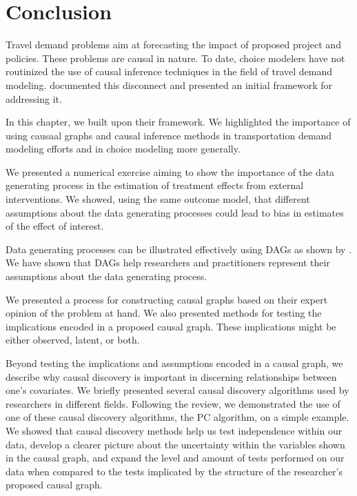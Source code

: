 \section{Conclusion}
\label{sec:conclusion}

Travel demand problems aim at forecasting the impact of proposed project and policies. These problems are causal in nature. 
To date, choice modelers have not routinized the use of causal inference techniques in the field of travel demand modeling.
\citet{brathwaite_2018_causal} documented this disconnect and presented an initial framework for addressing it.

In this chapter, we built upon their framework.
We highlighted the importance of using causaal graphs and causal inference methods in transportation demand modeling efforts and in choice modeling more generally.

We presented a numerical exercise aiming to show the importance of the data generating process in the estimation 
of treatment effects from external interventions. 
We showed, using the same outcome model, that different assumptions about the data generating processes could 
lead to bias in estimates of the effect of interest.

Data generating processes can be illustrated effectively using DAGs as shown by \citet{pearl_1995_causal}.
We have shown that DAGs help researchers and practitioners represent their assumptions about the data generating process. 

We presented a process for constructing causal graphs based on their expert opinion of the problem at hand. 
We also presented methods for testing the implications encoded in a proposed causal graph. 
These implications might be either observed, latent, or both.

Beyond testing the implications and assumptions encoded in a causal graph, we describe why causal discovery is important in discerning relationships between one's covariates.
We briefly presented several causal discovery algorithms used by
researchers in different fields. 
Following the review, we demonstrated the use of one of these causal discovery algorithms, the PC algorithm, on a simple example. 
We showed that causal discovery methods help us test independence within our data, 
develop a clearer picture about the uncertainty within the variables shown in the causal graph, 
and expand the level and amount of tests performed on our data when compared to the tests implicated 
by the structure of the researcher's proposed causal graph.

